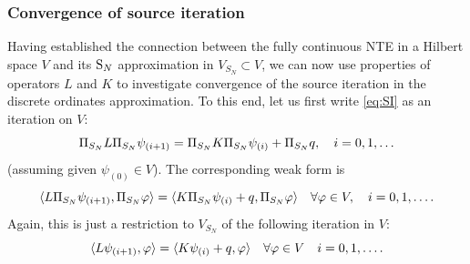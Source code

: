 \subsubsection{Convergence of source iteration} \label{sec:SI}
Having established the connection between the fully continuous NTE in a Hilbert space $V$ and its $\SN$
approximation in $V_{S_N} \subset V$, we can now use properties of operators $L$ and $K$ to
investigate convergence of the source iteration in the discrete ordinates approximation. To this end, let us first write
\eqref{eq:SI} as an iteration on $V$:
$$ 
	\Projop[S_N] \op{L} \Projop[S_N] \psi_{(i+1)} = \Projop[S_N] \op{K} \Projop[S_N] \psi_{(i)} +  \Projop[S_N] q,\quad i =
	0,1,\ldots 
$$
(assuming given $\psi_{(0)} \in V$). The corresponding weak form is 
\begin{equation}\label{eq:SISN}
	\langle \op{L} \Projop[S_N] \psi_{(i+1)}, \Projop[S_N] \varphi \rangle = \langle \op{K}\Projop[S_N] \psi_{(i)} + q,
	\Projop[S_N] \varphi \rangle\quad \forall \varphi\in V,\quad i = 0,1,\ldots. 
\end{equation}
Again, this is just a restriction to $V_{S_N}$ of the following iteration in $V$:
\begin{equation}\label{eq:SIhilbert}
	\langle \op{L} \psi_{(i+1)}, \varphi \rangle = \langle \op{K} \psi_{(i)} + q, \varphi \rangle \quad \forall
	\varphi\in V \quad i = 0,1,\ldots.
\end{equation}

